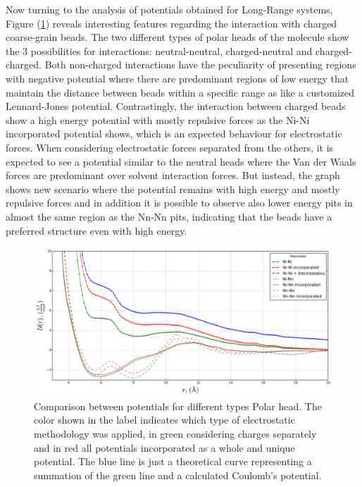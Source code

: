 \documentclass[10pt,a4paper,twoside]{article}
\begin{document}
Now turning to the analysis of potentials obtained for Long-Range systems, Figure (\ref{Fig:NNCha}) reveals interesting features regarding the interaction with charged coarse-grain beads. The two different types of polar heads of the molecule show the 3 possibilities for interactions: neutral-neutral, charged-neutral and charged-charged. Both non-charged interactions have the peculiarity of presenting regions with negative potential where there are predominant regions of low energy that maintain the distance between beads within a specific range as like a customized Lennard-Jones potential. Contrastingly, the interaction between charged beads show a high energy potential with mostly repulsive forces as the Ni-Ni incorporated potential shows, which is an expected behaviour for electrostatic forces. When considering electrostatic forces separated from the others, it is expected to see a  potential similar to the neutral heads where the Van der Waals forces are predominant over solvent interaction forces. But instead, the graph shows new scenario where the potential remains with high energy and mostly repulsive forces and in addition it is possible to observe also lower energy pits in almost the same region as the Nn-Nn pits, indicating that the beads have a preferred structure even with high energy.




\begin{figure}[H]
  \begin{center}
	\includegraphics[width=1 \textwidth]{./graphs/NNCha}
	\caption{Comparison between potentials for different types Polar head. The color shown in the label indicates which type of electrostatic methodology was applied, in green considering charges separately and in red all potentials incorporated as a whole and unique potential.  The blue line is just a theoretical curve representing a summation of the green line and a calculated Coulomb's potential.}
	\label{Fig:NNCha}
  \end{center}
\end{figure}
\end{document}
